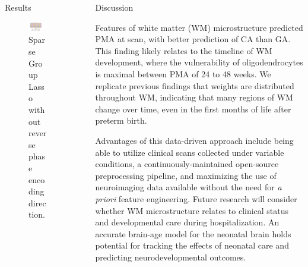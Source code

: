 \documentclass[final]{beamer}
\newlength{\sepwidth}
\newlength{\colwidth}
\newcommand{\separatorcolumn}{\begin{column}{\sepwidth}\end{column}}
\begin{document}
\begin{frame}[t]
\begin{columns}[t]
\begin{column}{\colwidth}
\begin{block}{Results}
    \begin{figure}
      \centering
      \includegraphics[trim=10 20 10 20,clip,width=0.8\textwidth]{sgl_nofmap.jpg}
      \caption{Sparse Group Lasso without reverse phase encoding direction.}
    \end{figure}

  \end{block}

\end{column}

\separatorcolumn

\begin{column}{\colwidth}

  \begin{block}{Discussion}

    Features of white matter (WM) microstructure predicted PMA at scan, with better prediction of CA than GA. This finding likely relates to the timeline of WM development, where the vulnerability of oligodendrocytes is maximal between PMA of 24 to 48 weeks. We replicate previous findings that weights are distributed throughout WM, indicating that many regions of WM change over time, even in the first months of life after preterm birth. 

    Advantages of this data-driven approach include being able to utilize clinical scans collected under variable conditions, a continuously-maintained open-source preprocessing pipeline, and maximizing the use of neuroimaging data available without the need for \textit{a priori} feature engineering. Future research will consider whether WM microstructure relates to clinical status and developmental care during hospitalization. An accurate brain-age model for the neonatal brain holds potential for tracking the effects of neonatal care and predicting neurodevelopmental outcomes.

  \end{block}


\end{column}
\end{columns}
\end{frame}
\end{document}

